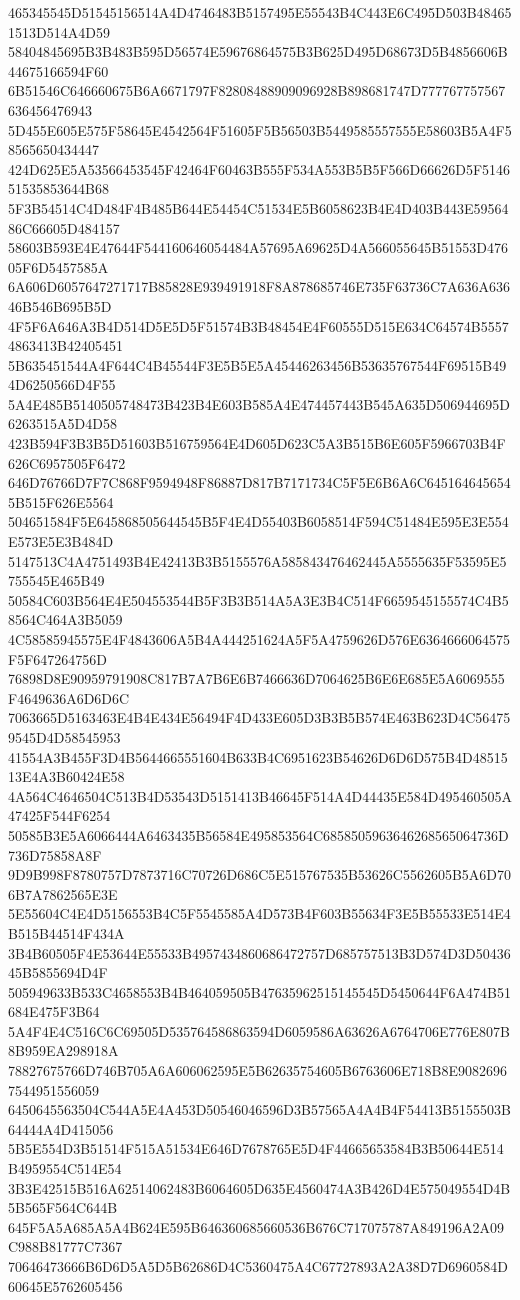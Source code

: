 {{{{{{{{{{{{{{{{{{{{{465345545D51545156514A4D4746483B5157495E55543B4C443E6C495D503B484651513D514A4D59
58404845695B3B483B595D56574E59676864575B3B625D495D68673D5B4856606B44675166594F60
6B51546C646660675B6A6671797F82808488909096928B898681747D777767757567636456476943
5D455E605E575F58645E4542564F51605F5B56503B5449585557555E58603B5A4F58565650434447
424D625E5A53566453545F42464F60463B555F534A553B5B5F566D66626D5F514651535853644B68
5F3B54514C4D484F4B485B644E54454C51534E5B6058623B4E4D403B443E5956486C66605D484157
58603B593E4E47644F544160646054484A57695A69625D4A566055645B51553D47605F6D5457585A
6A606D6057647271717B85828E939491918F8A878685746E735F63736C7A636A63646B546B695B5D
4F5F6A646A3B4D514D5E5D5F51574B3B48454E4F60555D515E634C64574B55574863413B42405451
5B635451544A4F644C4B45544F3E5B5E5A45446263456B53635767544F69515B494D6250566D4F55
5A4E485B5140505748473B423B4E603B585A4E474457443B545A635D506944695D6263515A5D4D58
423B594F3B3B5D51603B516759564E4D605D623C5A3B515B6E605F5966703B4F626C6957505F6472
646D76766D7F7C868F9594948F86887D817B7171734C5F5E6B6A6C6451646456545B515F626E5564
504651584F5E645868505644545B5F4E4D55403B6058514F594C51484E595E3E554E573E5E3B484D
5147513C4A4751493B4E42413B3B5155576A585843476462445A5555635F53595E5755545E465B49
50584C603B564E4E504553544B5F3B3B514A5A3E3B4C514F6659545155574C4B58564C464A3B5059
4C58585945575E4F4843606A5B4A444251624A5F5A4759626D576E6364666064575F5F647264756D
76898D8E90959791908C817B7A7B6E6B7466636D7064625B6E6E685E5A6069555F4649636A6D6D6C
7063665D5163463E4B4E434E56494F4D433E605D3B3B5B574E463B623D4C564759545D4D58545953
41554A3B455F3D4B5644665551604B633B4C6951623B54626D6D6D575B4D4851513E4A3B60424E58
4A564C4646504C513B4D53543D5151413B46645F514A4D44435E584D495460505A47425F544F6254
50585B3E5A6066444A6463435B56584E495853564C6858505963646268565064736D736D75858A8F
9D9B998F8780757D7873716C70726D686C5E515767535B53626C5562605B5A6D706B7A7862565E3E
5E55604C4E4D5156553B4C5F5545585A4D573B4F603B55634F3E5B55533E514E4B515B44514F434A
3B4B60505F4E53644E55533B4957434860686472757D685757513B3D574D3D5043645B5855694D4F
505949633B533C4658553B4B464059505B47635962515145545D5450644F6A474B51684E475F3B64
5A4F4E4C516C6C69505D535764586863594D6059586A63626A6764706E776E807B8B959EA298918A
78827675766D746B705A6A606062595E5B62635754605B6763606E718B8E90826967544951556059
6450645563504C544A5E4A453D50546046596D3B57565A4A4B4F54413B5155503B64444A4D415056
5B5E554D3B51514F515A51534E646D7678765E5D4F44665653584B3B50644E514B4959554C514E54
3B3E42515B516A62514062483B6064605D635E4560474A3B426D4E575049554D4B5B565F564C644B
645F5A5A685A5A4B624E595B646360685660536B676C717075787A849196A2A09C988B81777C7367
70646473666B6D6D5A5D5B62686D4C5360475A4C67727893A2A38D7D6960584D60645E5762605456
}}}}}}}}}}}}}}}}}}}}}

